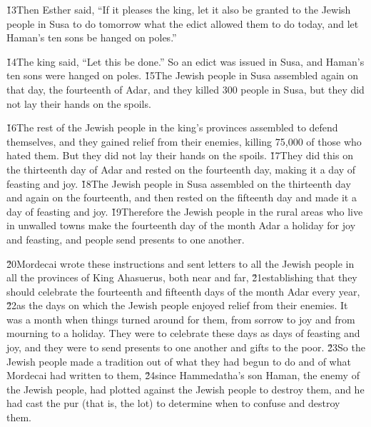 \v{13}Then Esther said, ``If it pleases the king, let it also be granted to the Jewish people in Susa to do tomorrow what the edict allowed them to do today, and let Haman's ten sons be hanged on poles.''

\v{14}The king said, ``Let this be done.'' So an edict was issued in Susa, and Haman's ten sons were hanged on poles. \v{15}The Jewish people in Susa assembled again on that day, the fourteenth of Adar, and they killed 300 people in Susa, but they did not lay their hands on the spoils.

\v{16}The rest of the Jewish people in the king's provinces assembled to defend themselves, and they gained relief from their enemies, killing 75,000 of those who hated them. But they did not lay their hands on the spoils. \v{17}They did this on the thirteenth day of Adar and rested on the fourteenth day, making it a day of feasting and joy. \v{18}The Jewish people in Susa assembled on the thirteenth day and again on the fourteenth, and then rested on the fifteenth day and made it a day of feasting and joy. \v{19}Therefore the Jewish people in the rural areas who live in unwalled towns make the fourteenth day of the month Adar a holiday for joy and feasting, and people send presents to one another.

\v{20}Mordecai wrote these instructions and sent letters to all the Jewish people in all the provinces of King Ahasuerus, both near and far, \v{21}establishing that they should celebrate the fourteenth and fifteenth days of the month Adar every year, \v{22}as the days on which the Jewish people enjoyed relief from their enemies. It was a month when things turned around for them, from sorrow to joy and from mourning to a holiday. They were to celebrate these days as days of feasting and joy, and they were to send presents to one another and gifts to the poor. \v{23}So the Jewish people made a tradition out of what they had begun to do and of what Mordecai had written to them, \v{24}since Hammedatha's son Haman, the enemy of the Jewish people, had plotted against the Jewish people to destroy them, and he had cast the pur (that is, the lot) to determine when to confuse and destroy them.

